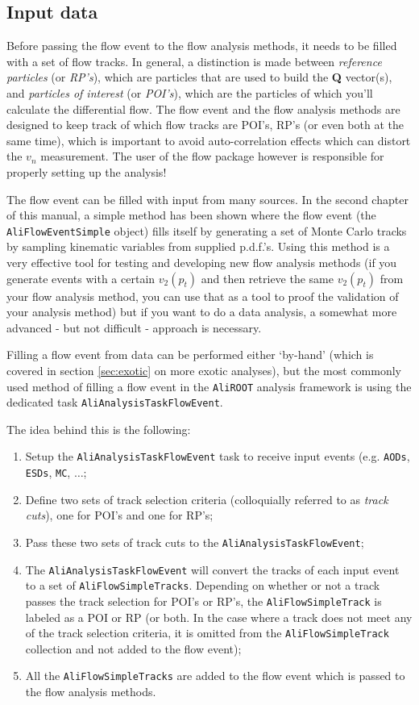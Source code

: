 \documentclass[a4paper]{book}
\numberwithin{equation}{subsection}
\begin{document}
\subsection{Input data}
Before passing the flow event to the flow analysis methods, it needs to be filled with a set of flow tracks. In general, a distinction is made between \emph{reference particles} (or \emph{RP's}), which are particles that are used to build the \textbf{Q} vector(s), and \emph{particles of interest} (or \emph{POI's}), which are the particles of which you'll calculate the differential flow. The flow event and the flow analysis methods are designed to keep track of which flow tracks are POI's, RP's (or even both at the same time), which is important to avoid auto-correlation effects which can distort the $v_n$ measurement. The user of the flow package however is responsible for properly setting up the analysis! 

The flow event can be filled with input from many sources. In the second chapter of this manual, a simple method has been shown where the flow event (the \texttt{AliFlowEventSimple} object) fills itself by generating a set of Monte Carlo tracks by sampling kinematic variables from supplied p.d.f.'s. Using this method is a very effective tool for testing and developing new flow analysis methods (if you generate events with a certain $v_2(p_t)$ and then retrieve the same $v_2(p_t)$ from your flow analysis method, you can use that as a tool to proof the validation of your analysis method) but if you want to do a data analysis, a somewhat more advanced - but not difficult - approach is necessary. 

Filling a flow event from data can be performed either `by-hand' (which is covered in section \ref{sec:exotic} on more exotic analyses), but the most commonly used method of filling a flow event in the \texttt{AliROOT} analysis framework is using the dedicated task \texttt{AliAnalysisTaskFlowEvent}. 

The idea behind this is the following:
\begin{enumerate}
\item Setup the \texttt{AliAnalysisTaskFlowEvent} task to receive input events (e.g. \texttt{AODs}, \texttt{ESDs}, \texttt{MC}, $\ldots$;
\item Define two sets of track selection criteria (colloquially referred to as \emph{track cuts}), one for POI's and one for RP's;
\item Pass these two sets of track cuts to the \texttt{AliAnalysisTaskFlowEvent};
\item The \texttt{AliAnalysisTaskFlowEvent} will convert the tracks  of each input event to a set of \texttt{AliFlowSimpleTracks}. Depending on whether or not a track passes the track selection for POI's or RP's, the \texttt{AliFlowSimpleTrack} is labeled as a POI or RP (or both. In the case where a track does not meet any of the track selection criteria, it is omitted from the \texttt{AliFlowSimpleTrack} collection and not added to the flow event);
\item All the \texttt{AliFlowSimpleTracks} are added to the flow event which is passed to the flow analysis methods. 
\end{enumerate}
\end{document}
